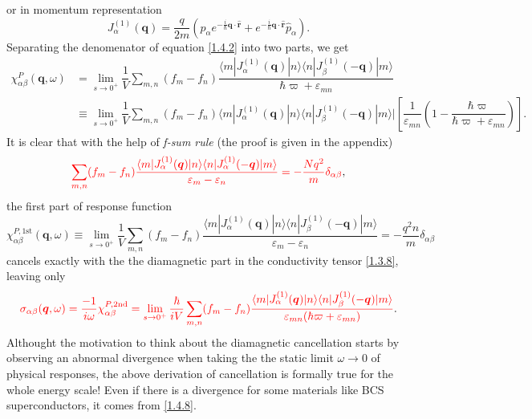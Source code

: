 \documentclass[10pt,nofootinbib,letterpaper]{revtex4}
\newcounter{Note}[section]
\newenvironment{Note}[1][]{{\par\normalfont\bfseries \underline{Note~\stepcounter{Note}\arabic{Note}.}~#1~~}}{\par}
\begin{document}
		or in momentum representation
		\begin{equation}\label{1.4.4}
			J^{(1)}_\alpha(\bm{q})=\dfrac{q}{2m}(\hat p_\alpha e^{-\frac i\hbar\bm{q}\cdot\hat{\bm{r}}}+e^{-\frac i\hbar\bm{q}\cdot\hat{\bm{r}}}\hat{p}_\alpha).
		\end{equation}
		Separating the denomenator of equation \eqref{1.4.2} into two parts, we get
		\begin{align}
			\chi_{\alpha\beta}^P(\bm{q},\omega)&=\lim_{s \rightarrow0^+}\dfrac{1}{V}\sum_{m,n}(f_m-f_n)\dfrac{\langle m|J^{(1)}_\alpha(\bm{q})|n\rangle\langle n|J^{(1)}_\beta(-\bm{q})|m\rangle}{\hbar\varpi+\varepsilon_{mn}}\\
			&\equiv\lim_{s \rightarrow0^+}\dfrac{1}{V}\sum_{m,n}(f_m-f_n)\langle m|J^{(1)}_\alpha(\bm{q})|n\rangle\langle n|J^{(1)}_\beta(-\bm{q})|m\rangle|\left[\dfrac{1}{\varepsilon_{mn}}\left(1-\dfrac{\hbar\varpi}{\hbar\varpi+\varepsilon_{mn}}\right)\right].\label{1.4.5}
		\end{align}
		\indent It is clear that with the help of \emph{f-sum rule} (the proof is given in the appendix)
		\begin{equation}\label{1.4.6}
			{\color{red}\sum_{m,n}(f_m-f_n)\dfrac{\langle m|J^{(1)}_\alpha(\bm{q})|n\rangle\langle n|J^{(1)}_\alpha(-\bm{q})|m\rangle}{\varepsilon_m-\varepsilon_n}=-\frac{Nq^2}{m}\delta_{\alpha\beta}},
		\end{equation}
		the first part of response function
		\begin{equation}\label{1.4.7}
			\chi_{\alpha\beta}^{P,\text{1st}}(\bm{q},\omega)\equiv\lim_{s \rightarrow0^+}\dfrac{1}{V}\sum_{m,n}(f_m-f_n)\dfrac{\langle m|J^{(1)}_\alpha(\bm{q})|n\rangle\langle n|J^{(1)}_\beta(-\bm{q})|m\rangle}{\varepsilon_m-\varepsilon_n}=-\dfrac{q^2 n}{m}\delta_{\alpha\beta}
		\end{equation}
		cancels exactly with the the diamagnetic part in the conductivity tensor \eqref{1.3.8}, leaving only
		\begin{equation}\label{1.4.8}
			{\color{red}\sigma_{\alpha\beta}(\bm{q},\omega)=\dfrac{-1}{i\omega}\chi_{\alpha\beta}^{P,\text{2nd}}=\lim_{s \rightarrow0^+}\dfrac{\hbar}{iV}\sum_{m,n}(f_m-f_n)\dfrac{\langle m|J^{(1)}_\alpha(\bm{q})|n\rangle\langle n|J^{(1)}_\beta(-\bm{q})|m\rangle}{\varepsilon_{mn}(\hbar\varpi+\varepsilon_{mn})}}.
		\end{equation}
		\begin{Note}
			Althought the motivation to think about the diamagnetic cancellation starts by observing an abnormal divergence when taking the the static limit $\omega \rightarrow 0$ of physical responses, the above derivation of cancellation is formally true for the whole energy scale! Even if there is a divergence for some materials like BCS superconductors, it comes from \eqref{1.4.8}.
		\end{Note}
\end{document}
